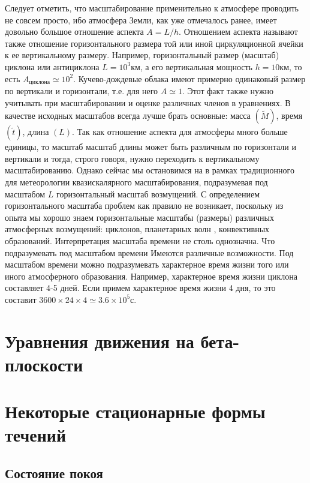 Следует отметить, что масштабирование применительно к атмосфере проводить не совсем просто, ибо атмосфера Земли, как уже отмечалось ранее, имеет довольно большое отношение аспекта $A=L/h$. Отношением аспекта называют также отношение горизонтального размера той или иной циркуляционной ячейки к ее вертикальному размеру. Например, горизонтальный размер (масштаб) циклона или антициклона $L=10^3$км, а его вертикальная мощность $h = 10$км, то есть $A_{циклона}  \simeq 10^2$. Кучево-дождевые облака имеют примерно одинаковый размер по вертикали и горизонтали, т.е. для него $A \simeq 1$. Этот факт также нужно учитывать при масштабировании и оценке различных членов в уравнениях. В качестве исходных масштабов всегда лучше брать основные: масса $(\tilde{M})$, время $(\tilde{t})$, длина $(L)$. Так как отношение аспекта для атмосферы много больше единицы, то масштаб масштаб длины может быть различным по горизонтали и вертикали и тогда, строго говоря, нужно переходить к вертикальному масштабированию. Однако сейчас мы остановимся на в рамках традиционного для метеорологии квазискалярного масштабирования, подразумевая под масштабом $L$ горизонтальный масштаб возмущений. С определением горизонтального масштаба проблем как правило не возникает, поскольку из опыта мы хорошо знаем горизонтальные масштабы (размеры) различных атмосферных возмущений: циклонов, планетарных волн , конвективных образований. Интерпретация масштаба времени не столь однозначна. Что подразумевать под масштабом времени Имеются различные возможности. Под масштабом времени можно  подразумевать характерное время жизни того или иного атмосферного образования. Например, характерное время жизни циклона составляет 4-5 дней. Если примем характерное время жизни 4 дня, то это составит $3600\times24\times4\simeq3.6\times10^5$с. 



\section{{\color{noone}Уравнения движения на бета-плоскости}}
    \lipsum[1-2]

\section{Некоторые стационарные формы течений}
    \lipsum[1-2]

\subsection{Состояние покоя}
    \lipsum[1-2]

